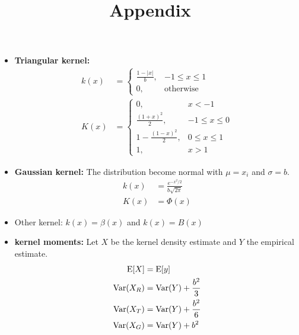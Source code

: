 \documentclass[10pt, french]{article}
\begin{document}
\begin{multicols*}{3}
\begin{itemize}[align=left,leftmargin=*]
    \item \textbf{Triangular kernel:} 
    \begin{align*}
        k(x) &= 
            \left\{
                \begin{array}{cc}
                    \frac{1 - |x|}{b}, & -1 \leq x \leq 1 \\
                    0,   & \mathrm{otherwise}
                \end{array} 
            \right. \\
        K(x) &= 
        \left\{
            \begin{array}{cc}
                0, & x < -1 \\
                \frac{(1+x)^2}{2}, & -1 \leq x \leq 0 \\ 
                1 - \frac{(1-x)^2}{2}, & 0 \leq x \leq 1 \\ 
                1,   & x > 1 
            \end{array} 
        \right.
    \end{align*}
    \item \textbf{Gaussian kernel:} The distribution become normal with $\mu=x_i$ and $\sigma=b$.
    \begin{align*}
        k(x) &= \frac{e^{-x^2/2}}{b\sqrt{2\pi}} \\
        K(x) &= \Phi(x)
    \end{align*}
    \item Other kernel: $k(x)=\beta(x)$ and $k(x) = B(x)$
    \item \textbf{kernel moments:} Let $X$ be the kernel density estimate and $Y$ the empirical estimate.
    \begin{align*}
        \mathrm{E} {\left[ X \right]} &= \mathrm{E} {\left[ y \right]} \\
        \mathrm{Var} {\left( X_R \right)} &= \mathrm{Var} {\left( Y \right)} + \frac{b^2}{3} \\
        \mathrm{Var} {\left( X_T \right)} &= \mathrm{Var} {\left( Y \right)} + \frac{b^2}{6} \\
        \mathrm{Var} {\left( X_G \right)} &= \mathrm{Var} {\left( Y \right)} + b^2
    \end{align*}
     
\end{itemize}

\newpage
\title{Appendix}
\date{}
\author{}
\maketitle
\vspace{-70px}
\def\SectionColor{black!80!white}

\end{multicols*}
\end{document}
